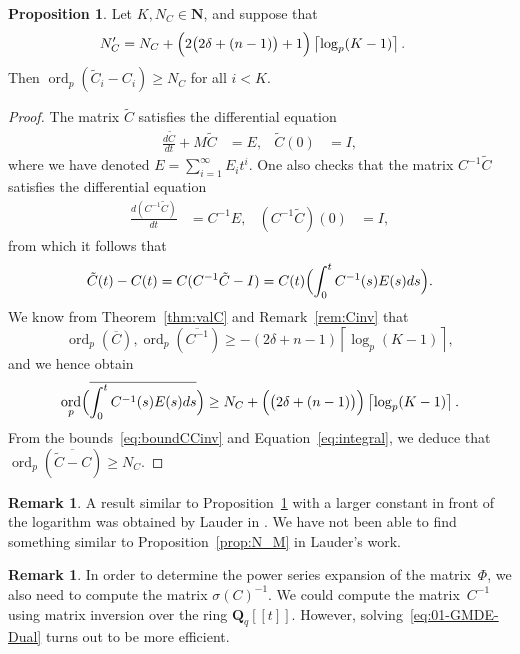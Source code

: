 \documentclass[a4paper,11pt]{article}
\numberwithin{equation}{section}
\providecommand{\ceil}[1]{\left\lceil#1\right\rceil}   %
\newcommand{\NN}{\mathbf{N}} %
\DeclareMathOperator{\ord}{ord}          %
\theoremstyle{definition}
\newtheorem{prop}[thm]{Proposition}
\newtheorem{rem}[thm]{Remark}
\begin{document}
\begin{prop} \label{thm:errorprop}
Let $K,N_{C} \in \NN$, and suppose that
\begin{align*}
N'_C          &= N_{C} + \Bigl(2 \bigl(2 \delta + (n-1)\bigr) + 1\Bigr) \ceil{\log_p(K-1)}.
\end{align*} 
Then $\ord_p(\tilde{C}_i-C_i) \geq N_{C}$ for all $i < K$.
\end{prop}

\begin{proof}
The matrix $\tilde{C}$ satisfies the differential equation
\begin{align*}
\frac{d\tilde{C}}{dt}+M \tilde{C}&=E, &\tilde{C}(0)&=I,
\end{align*}
where we have denoted $E=\sum_{i=1}^{\infty} E_i t^i$.
One also checks that the matrix $C^{-1}\tilde{C}$ satisfies 
the differential equation
\begin{align*}
\frac{d(C^{-1}\tilde{C})}{dt} &=C^{-1} E, &(C^{-1}\tilde{C})(0)&=I,
\end{align*}
from which it follows that
\begin{equation} \label{eq:integral}
\tilde{C}(t)-C(t) = C(C^{-1} \tilde{C}-I) = C(t) \Bigl(\int_{0}^t C^{-1}(s) E(s) ds \Bigr).
\end{equation}
We know from Theorem~\ref{thm:valC} and Remark~\ref{rem:Cinv} that
\begin{equation} \label{eq:boundCCinv}
\ord_p(\overline{C}),\ord_p(\overline{C^{-1}}) \geq 
-(2 \delta + n-1) \ceil{\log_p(K-1)},
\end{equation}
and we hence obtain
\[
\ord_p \Bigl(\overline{\int_{0}^t C^{-1}(s) E(s) ds }\Bigr) \geq 
N_{C} + \Bigl( \bigl(2 \delta + (n-1)\bigr) \Bigr) \ceil{\log_p(K-1)}.
\]
From the bounds~\eqref{eq:boundCCinv} and Equation~\eqref{eq:integral}, 
we deduce that $\ord_p(\overline{\tilde{C}-C}) \geq N_C$.
\end{proof}

\begin{rem}
A result similar to Proposition~\ref{thm:errorprop} with a larger constant in front of 
the logarithm was obtained by Lauder in \citep[Theorem 5.1]{Lauder2006}. We have
not been able to find something similar to Proposition~\ref{prop:N_M} in Lauder's work.
\end{rem}

\begin{rem} \label{rem:sigmatrick}
In order to determine the power series expansion of the matrix~$\Phi$, 
we also need to compute the matrix $\sigma(C)^{-1}$. We could compute 
the matrix~$C^{-1}$ using matrix inversion over the ring $\mathbf{Q}_q[[t]]$. 
However, solving~\eqref{eq:01-GMDE-Dual} turns
out to be more efficient. 
\end{rem}
\end{document}
